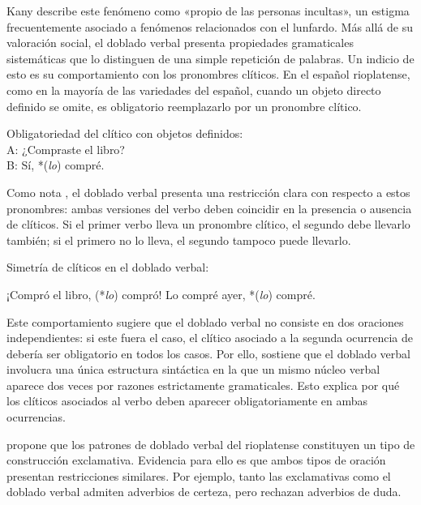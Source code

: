 Kany describe este fenómeno como «propio de las personas incultas», un estigma
frecuentemente asociado a fenómenos relacionados con el lunfardo. Más allá de su
valoración social, el doblado verbal presenta propiedades gramaticales
sistemáticas que lo distinguen de una simple repetición de palabras. Un indicio
de esto es su comportamiento con los pronombres clíticos. En el español
rioplatense, como en la mayoría de las variedades del español, cuando un objeto
directo definido se omite, es obligatorio reemplazarlo por un pronombre clítico.

\begin{exe}
  \ex\label{ex:15-libro} Obligatoriedad del clítico con objetos definidos:\\
      A: ¿Compraste el libro?\\
      B: Sí, *(\textit{lo}) compré.
\end{exe}

Como nota \textcite{saab2008}, el doblado verbal presenta una restricción clara
con respecto a estos pronombres: ambas versiones del verbo deben coincidir en la
presencia o ausencia de clíticos. Si el primer verbo lleva un pronombre clítico,
el segundo debe llevarlo también; si el primero no lo lleva, el segundo tampoco
puede llevarlo.

\begin{exe}
  \ex\label{ex:15-simetria} Simetría de clíticos en el doblado verbal:
    \begin{xlist}
      \ex ¡Compró el libro, (*\textit{lo}) compró!
      \ex Lo compré ayer, *(\textit{lo}) compré.
    \end{xlist}
\end{exe}

Este comportamiento sugiere que el doblado verbal no consiste en dos oraciones
independientes: si este fuera el caso, el clítico  asociado a la
segunda ocurrencia de  debería ser obligatorio en todos los casos.
Por ello, \textcite{saab2008} sostiene que el doblado verbal involucra una única
estructura sintáctica en la que un mismo núcleo verbal aparece dos veces por
razones estrictamente gramaticales. Esto explica por qué los clíticos asociados al
verbo deben aparecer obligatoriamente en ambas ocurrencias.

\textcite{munozperez2021} propone que los patrones de doblado verbal del
rioplatense constituyen un tipo de construcción exclamativa. Evidencia para ello
es que ambos tipos de oración presentan restricciones similares. Por ejemplo,
tanto las exclamativas como el doblado verbal admiten adverbios de certeza, pero
rechazan adverbios de duda.

